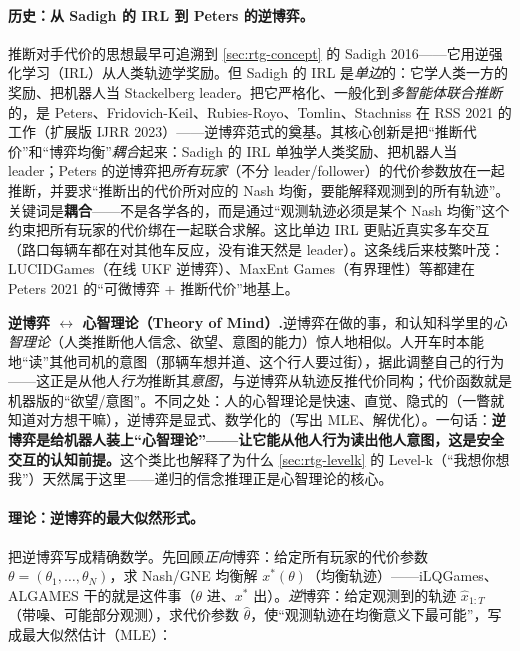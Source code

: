 \paragraph{历史：从 Sadigh 的 IRL 到 Peters 的逆博弈。}
推断对手代价的思想最早可追溯到 \cref{sec:rtg-concept} 的 Sadigh 2016——它用逆强化学习（IRL）从人类轨迹学奖励\cite{sadigh2016planning}。但 Sadigh 的 IRL 是\emph{单边}的：它学人类一方的奖励、把机器人当 Stackelberg leader。把它严格化、一般化到\emph{多智能体联合推断}的，是 Peters、Fridovich-Keil、Rubies-Royo、Tomlin、Stachniss 在 RSS 2021 的工作（扩展版 IJRR 2023）——逆博弈范式的奠基\cite{peters2021inferring}。其核心创新是把“推断代价”和“博弈均衡”\emph{耦合}起来：Sadigh 的 IRL 单独学人类奖励、把机器人当 leader；Peters 的逆博弈把\emph{所有玩家}（不分 leader/follower）的代价参数放在一起推断，并要求“推断出的代价所对应的 Nash 均衡，要能解释观测到的所有轨迹”。关键词是\textbf{耦合}——不是各学各的，而是通过“观测轨迹必须是某个 Nash 均衡”这个约束把所有玩家的代价绑在一起联合求解。这比单边 IRL 更贴近真实多车交互（路口每辆车都在对其他车反应，没有谁天然是 leader）。这条线后来枝繁叶茂：LUCIDGames（在线 UKF 逆博弈）、MaxEnt Games（有界理性）等都建在 Peters 2021 的“可微博弈 + 推断代价”地基上。

\begin{insight}
\textbf{逆博弈 $\leftrightarrow$ 心智理论（Theory of Mind）.}\;逆博弈在做的事，和认知科学里的\emph{心智理论}（人类推断他人信念、欲望、意图的能力）惊人地相似。人开车时本能地“读”其他司机的意图（那辆车想并道、这个行人要过街），据此调整自己的行为——这正是从他人\emph{行为}推断其\emph{意图}，与逆博弈从轨迹反推代价同构；代价函数就是机器版的“欲望/意图”。不同之处：人的心智理论是快速、直觉、隐式的（一瞥就知道对方想干嘛），逆博弈是显式、数学化的（写出 MLE、解优化）。一句话：\textbf{逆博弈是给机器人装上“心智理论”——让它能从他人行为读出他人意图，这是安全交互的认知前提。}这个类比也解释了为什么 \cref{sec:rtg-levelk} 的 Level-k（“我想你想我”）天然属于这里——递归的信念推理正是心智理论的核心。
\end{insight}

\paragraph{理论：逆博弈的最大似然形式。}
把逆博弈写成精确数学。先回顾\emph{正向}博弈：给定所有玩家的代价参数 $\theta=(\theta_1,\dots,\theta_N)$，求 Nash/GNE 均衡解 $x^*(\theta)$（均衡轨迹）——iLQGames、ALGAMES 干的就是这件事（$\theta$ 进、$x^*$ 出）。\emph{逆}博弈：给定观测到的轨迹 $\hat x_{1:T}$（带噪、可能部分观测），求代价参数 $\hat\theta$，使“观测轨迹在均衡意义下最可能”，写成最大似然估计（MLE）：

